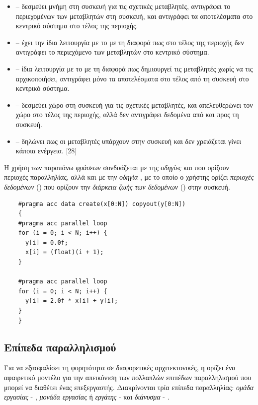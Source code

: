 \begin{itemize}
\item {} – δεσμεύει μνήμη στη συσκευή για τις σχετικές μεταβλητές, αντιγράφει το περιεχομένων των μεταβλητών στη συσκευή, και αντιγράφει τα αποτελέσματα στο κεντρικό σύστημα στο τέλος της περιοχής.
\item {} – έχει την ίδια λειτουργία με το  με τη διαφορά πως στο τέλος της περιοχής δεν αντιγράφει το περιεχόμενο των μεταβλητών στο κεντρικό σύστημα.
\item {} – ίδια λειτουργία με το  με τη διαφορά πως δημιουργεί τις μεταβλητές χωρίς να τις αρχικοποιήσει, αντιγράφει μόνο τα αποτελέσματα στο τέλος από τη συσκευή στο κεντρικό σύστημα.
\item {} – δεσμεύει χώρο στη συσκευή για τις σχετικές μεταβλητές, και απελευθερώνει τον χώρο στο τέλος της περιοχής, αλλά δεν αντιγράφει δεδομένα από και προς τη συσκευή.
\item {} – δηλώνει πως οι μεταβλητές υπάρχουν στην συσκευή και δεν χρειάζεται γίνει κάποια ενέργεια. [28]
\end{itemize}

Η χρήση των παραπάνω \textit{φράσεων} συνδυάζεται με της \textit{οδηγίες}  και  που ορίζουν περιοχές παραλληλίας, αλλά και με την \textit{οδηγία} , με το οποίο ο χρήστης ορίζει \textit{περιοχές δεδομένων} () που ορίζουν την \textit{διάρκεια ζωής των δεδομένων} () στην συσκευή.

   \begin{verbatim}
    #pragma acc data create(x[0:N]) copyout(y[0:N])
    {
    #pragma acc parallel loop
    for (i = 0; i < N; i++) {
      y[i] = 0.0f;
      x[i] = (float)(i + 1);
    }
    
    #pragma acc parallel loop
    for (i = 0; i < N; i++) {
      y[i] = 2.0f * x[i] + y[i];
    }
    }
\end{verbatim}


\subsection{Επίπεδα παραλληλισμού}

Για να εξασφαλίσει τη φορητότητα σε διαφορετικές αρχιτεκτονικές, η  ορίζει ένα αφαιρετικό μοντέλο για την απεικόνιση των πολλαπλών επιπέδων παραλληλισμού που μπορεί να διαθέτει ένας επεξεργαστής. Διακρίνονται τρία επίπεδα παραλληλίας: \textit{ομάδα εργασίας} - , \textit{μονάδα εργασίας} ή \textit{εργάτης} -  και \textit{διάνυσμα} - . 
 
